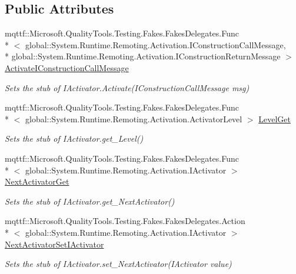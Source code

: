 \subsection*{Public Attributes}
\begin{DoxyCompactItemize}
\item 
mqttf\-::\-Microsoft.\-Quality\-Tools.\-Testing.\-Fakes.\-Fakes\-Delegates.\-Func\\*
$<$ global\-::\-System.\-Runtime.\-Remoting.\-Activation.\-I\-Construction\-Call\-Message, \\*
global\-::\-System.\-Runtime.\-Remoting.\-Activation.\-I\-Construction\-Return\-Message $>$ \hyperlink{class_system_1_1_runtime_1_1_remoting_1_1_activation_1_1_fakes_1_1_stub_i_activator_a700b6195f1057cd584971263bc74f802}{Activate\-I\-Construction\-Call\-Message}
\begin{DoxyCompactList}\small\item\em Sets the stub of I\-Activator.\-Activate(\-I\-Construction\-Call\-Message msg)\end{DoxyCompactList}\item 
mqttf\-::\-Microsoft.\-Quality\-Tools.\-Testing.\-Fakes.\-Fakes\-Delegates.\-Func\\*
$<$ global\-::\-System.\-Runtime.\-Remoting.\-Activation.\-Activator\-Level $>$ \hyperlink{class_system_1_1_runtime_1_1_remoting_1_1_activation_1_1_fakes_1_1_stub_i_activator_a4d18dabe9c5f5d34e645f4839a63ef5e}{Level\-Get}
\begin{DoxyCompactList}\small\item\em Sets the stub of I\-Activator.\-get\-\_\-\-Level()\end{DoxyCompactList}\item 
mqttf\-::\-Microsoft.\-Quality\-Tools.\-Testing.\-Fakes.\-Fakes\-Delegates.\-Func\\*
$<$ global\-::\-System.\-Runtime.\-Remoting.\-Activation.\-I\-Activator $>$ \hyperlink{class_system_1_1_runtime_1_1_remoting_1_1_activation_1_1_fakes_1_1_stub_i_activator_a10e2a33f489830d59c2d1a58539d37f9}{Next\-Activator\-Get}
\begin{DoxyCompactList}\small\item\em Sets the stub of I\-Activator.\-get\-\_\-\-Next\-Activator()\end{DoxyCompactList}\item 
mqttf\-::\-Microsoft.\-Quality\-Tools.\-Testing.\-Fakes.\-Fakes\-Delegates.\-Action\\*
$<$ global\-::\-System.\-Runtime.\-Remoting.\-Activation.\-I\-Activator $>$ \hyperlink{class_system_1_1_runtime_1_1_remoting_1_1_activation_1_1_fakes_1_1_stub_i_activator_aad7783c610e0eb721ec81f11cbf0254c}{Next\-Activator\-Set\-I\-Activator}
\begin{DoxyCompactList}\small\item\em Sets the stub of I\-Activator.\-set\-\_\-\-Next\-Activator(\-I\-Activator value)\end{DoxyCompactList}\end{DoxyCompactItemize}


